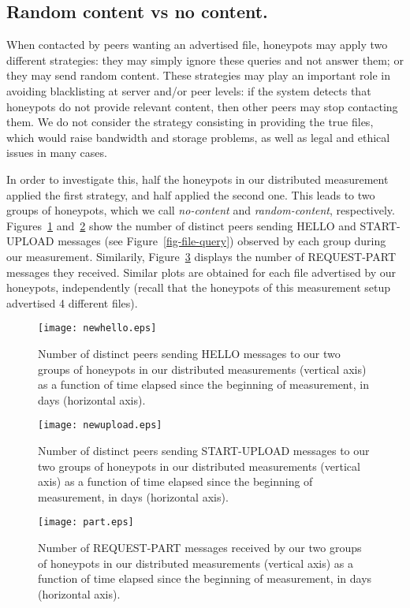 \documentclass[final,
notitlepage,
narroweqnarray,
	inline,
	twoside,
]{ieee}
\begin{document}
\subsection{Random content vs no content.}
\label{sec-random}

When contacted by peers wanting an  advertised file, honeypots may
apply two different strategies: they may simply ignore these queries
and not answer them; or they may send random content. These strategies may play an
important role in avoiding blacklisting at server and/or peer levels:
if the system detects that honeypots do not provide relevant
content, then other peers may stop contacting them. We do
  not consider the strategy consisting in providing the true files,
  which would raise bandwidth and storage problems, as well as legal
  and ethical issues in many cases.

In order to investigate this, half the honeypots in our distributed measurement applied the first strategy, and half applied the second one. This leads to two groups of  honeypots, which we call {\em no-content} and {\em random-content}, respectively. Figures~\ref{fig-hello} and~\ref{fig-upload} show the number of distinct peers sending HELLO and START-UPLOAD messages (see Figure~\ref{fig-file-query}) observed by each group during our measurement. Similarily, Figure~\ref{fig-part} displays the number of REQUEST-PART messages they received. Similar plots are obtained for each file advertised by our honeypots, independently (recall that the honeypots of this measurement setup advertised 4 different files).

\begin{figure}[h!]
  \centering
  \texttt{[image: newhello.eps]}
  \caption{Number of distinct peers sending HELLO messages to our two
    groups of honeypots in our distributed measurements (vertical axis) as a function of time elapsed
    since the beginning of measurement, in days (horizontal axis).}
  \label{fig-hello}
\end{figure}

\begin{figure}[h!]
  \centering
  \texttt{[image: newupload.eps]}
  \caption{Number of distinct peers sending START-UPLOAD messages to
    our two groups of honeypots in our distributed measurements (vertical axis) as a function of time
    elapsed since the beginning of measurement, in days (horizontal
    axis).}
  \label{fig-upload}
\end{figure}

\begin{figure}[h!]
  \centering
  \texttt{[image: part.eps]}
  \caption{Number of REQUEST-PART messages received by our two groups
    of honeypots in our distributed measurements (vertical axis) as a function of time elapsed since
    the beginning of measurement, in days (horizontal axis).}
  \label{fig-part}
\end{figure}
\end{document}
